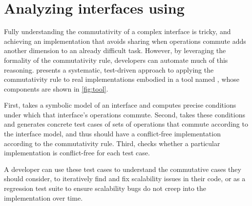 \section{Analyzing interfaces using \tool}
\label{sec:tool}


Fully understanding the commutativity of a complex interface is
tricky, and achieving an
implementation that avoids sharing when operations commute adds another
dimension to an already difficult task.  However, by leveraging the
formality of the commutativity rule, developers can automate much of this
reasoning.   presents a systematic, test-driven approach to
applying the commutativity rule to real implementations embodied in a
tool named \tool, whose components are shown in
\cref{fig:tool}.


\begin{figure*}
\centering

\caption{The components of \tool.}
\label{fig:tool}
\end{figure*}

First, \analyzer takes a symbolic model of
an interface and computes precise conditions under which that interface's
operations commute.  Second, \testgen takes
these conditions and generates concrete test cases of sets of operations
that commute according to the interface model, and thus should
have a conflict-free implementation according to the commutativity rule.
%
Third, \mtrace checks whether a particular implementation is
conflict-free for each test case.

A developer can use these test cases to understand the
commutative cases they should consider,
to iteratively find and fix scalability
issues in their
code, or as a regression test suite to ensure
scalability bugs do not creep into the implementation over time.


\subsection{\analyzer}
\label{sec:tool:analyzer}



